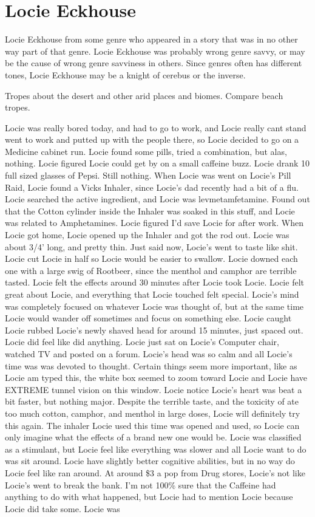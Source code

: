 \documentclass[12pt]{book}
\begin{document}
\chapter{Locie Eckhouse}

Locie Eckhouse from some genre who appeared in a story that was in no other way part of that genre. Locie Eckhouse was probably wrong genre savvy, or may be the cause of wrong genre savviness in others. Since genres often has different tones, Locie Eckhouse may be a knight of cerebus or the inverse.



Tropes about the desert and other arid places and biomes. Compare beach tropes.



Locie was really bored today, and had to go to work, and Locie really cant stand went to work and putted up with the people there, so Locie decided to go on a Medicine cabinet run. Locie found some pills, tried a combination, but alas, nothing. Locie figured Locie could get by on a small caffeine buzz. Locie drank 10 full sized glasses of Pepsi. Still nothing. When Locie was went on Locie's Pill Raid, Locie found a Vicks Inhaler, since Locie's dad recently had a bit of a flu. Locie searched the active ingredient, and Locie was levmetamfetamine. Found out that the Cotton cylinder inside the Inhaler was soaked in this stuff, and Locie was related to Amphetamines. Locie figured I'd save Locie for after work. When Locie got home, Locie opened up the Inhaler and got the rod out. Locie was about 3/4' long, and pretty thin. Just said now, Locie's went to taste like shit. Locie cut Locie in half so Locie would be easier to swallow. Locie downed each one with a large swig of Rootbeer, since the menthol and camphor are terrible tasted. Locie felt the effects around 30 minutes after Locie took Locie. Locie felt great about Locie, and everything that Locie touched felt special. Locie's mind was completely focused on whatever Locie was thought of, but at the same time Locie would wander off sometimes and focus on something else. Locie caught Locie rubbed Locie's newly shaved head for around 15 minutes, just spaced out. Locie did feel like did anything. Locie just sat on Locie's Computer chair, watched TV and posted on a forum. Locie's head was so calm and all Locie's time was was devoted to thought. Certain things seem more important, like as Locie am typed this, the white box seemed to zoom toward Locie and Locie have EXTREME tunnel vision on this window. Locie notice Locie's heart was beat a bit faster, but nothing major. Despite the terrible taste, and the toxicity of ate too much cotton, camphor, and menthol in large doses, Locie will definitely try this again. The inhaler Locie used this time was opened and used, so Locie can only imagine what the effects of a brand new one would be. Locie was classified as a stimulant, but Locie feel like everything was slower and all Locie want to do was sit around. Locie have slightly better cognitive abilities, but in no way do Locie feel like ran around. At around \$3 a pop from Drug stores, Locie's not like Locie's went to break the bank. I'm not 100\% sure that the Caffeine had anything to do with what happened, but Locie had to mention Locie because Locie did take some. Locie was 
\end{document}
